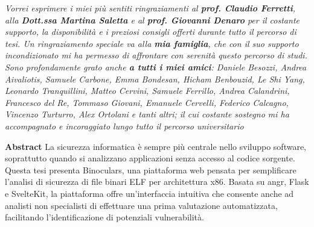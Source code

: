 \documentclass[12pt, a4paper, oneside]{report}
\begin{document}
    
    \thispagestyle{empty}
    \vspace*{\fill}
    \vspace*{-4.5cm}
    \begin{Center}
        \begin{minipage}{\textwidth}
            \centering
            \itshape
            Vorrei esprimere i miei più sentiti ringraziamenti al \textbf{prof. Claudio Ferretti}, alla \textbf{Dott.ssa Martina Saletta} e al \textbf{prof. Giovanni Denaro} per il costante supporto, la disponibilità e i preziosi consigli offerti durante tutto il percorso di tesi.
            \newline \vspace*{1.5em}
            Un ringraziamento speciale va alla \textbf{mia famiglia}, che con il suo supporto incondizionato mi ha permesso di affrontare con serenità questo percorso di studi. \newline \vspace*{1.5em}
            Sono profondamente grato anche \textbf{a tutti i miei amici}: Daniele Besozzi, Andrea Aivaliotis, Samuele Carbone, Emma Bondesan, Hicham Benbouzid, Le Shi Yang, Leonardo Tranquillini, Matteo Cervini, Samuele Ferrillo, Andrea Calandrini, Francesco del Re, Tommaso Giovani, Emanuele Cervelli, Federico Calcagno, Vincenzo Turturro, Alex Ortolani e tanti altri; il cui costante sostegno mi ha accompagnato e incoraggiato lungo tutto il percorso universitario
        \end{minipage}
    \end{Center}
    \vspace*{\fill}
    \newpage
    \clearpage
    \thispagestyle{empty}
    \vspace*{\fill}
    \vspace*{-4cm}
    \begin{Center}
        \begin{minipage}{\textwidth}
            \centering
            \textbf{Abstract} \newline
            La sicurezza informatica è sempre più centrale nello sviluppo software, soprattutto quando si analizzano applicazioni senza accesso al codice sorgente. Questa tesi presenta Binoculars, una piattaforma web pensata per semplificare l’analisi di sicurezza di file binari ELF per architettura x86. Basata su angr, Flask e SvelteKit, la piattaforma offre un’interfaccia intuitiva che consente anche ad analisti non specialisti di effettuare una prima valutazione automatizzata, facilitando l’identificazione di potenziali vulnerabilità.
        \end{minipage}
    \end{Center}
    \vspace*{\fill}
    \addtocounter{page}{-2}
\end{document}
